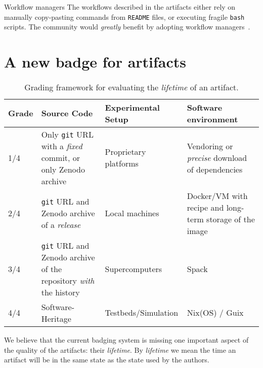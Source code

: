 \documentclass[sigconf,natbib=false]{acmart}
\newcommand{\ad}{Artifact Description}
\newcommand{\aeval}{Artifact Evaluation}
\newcommand{\adae}{\ad/\aeval}
\begin{document}
\begin{lesson}{Workflow managers}{}
  The workflows described in the artifacts either rely on manually copy-pasting commands from \texttt{README} files, or executing fragile \texttt{bash} scripts.
  The community would \emph{greatly} benefit by adopting workflow managers\ \cite{wratten2021reproducible}.
\end{lesson}

%
%


%
\section{A new badge for artifacts}\label{sec:lifetime}

\begin{table*}
  \caption{\label{tab:lifetime}Grading framework for evaluating the \emph{lifetime} of an artifact.}
  \centering
  \begin{tabular}[t]{l p{18em} p{9em} p{22em}}
  \toprule
    Grade & Source Code &  Experimental Setup & Software environment \\
  \midrule
    1/4 & Only \texttt{git} URL with a \emph{fixed} commit, or only Zenodo archive & Proprietary platforms & Vendoring or \emph{precise} download of dependencies \\
    2/4 & \texttt{git} URL and Zenodo archive of a \emph{release} & Local machines & Docker/VM with recipe and long-term storage of the image \\
    3/4 & \texttt{git} URL and Zenodo archive of the repository \emph{with} the history & Supercomputers & Spack \\
    4/4 & Software-Heritage & Testbeds/Simulation  & Nix(OS) / Guix \\
  \bottomrule
  \end{tabular}
\end{table*}

We believe that the current badging system is missing one important aspect of the quality of the artifacts: their \emph{lifetime}.
By \emph{lifetime} we mean the time an artifact will be in the same state as the state used by the authors.
\end{document}
